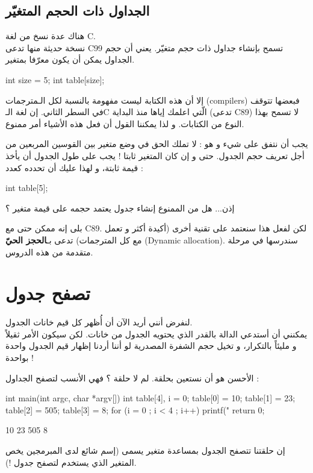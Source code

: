 \subsection{الجداول ذات الحجم المتغيّر}
هناك عدة نسخ من لغة
\textenglish{C}.\\
نسخة حديثة منها تدعى
\textenglish{C99}
تسمح بإنشاء جداول ذات حجم متغيّر. يعني أن حجم الجداول يمكن أن يكون معرّفا بمتغير.
\begin{Csource}
int size = 5;
int table[size];
\end{Csource}
إلا أن هذه الكتابة ليست مفهومة بالنسبة لكل الـمترجمات
(\textenglish{compilers})
فبعضها تتوقف في السطر الثاني. إن لغة
الـ\textenglish{C}
الّتي اعلمك إياها منذ البداية (تدعى
\textenglish{C89})
لا تسمح بهذا النوع من الكتابات. و لذا يمكننا القول أن فعل هذه الأشياء أمر ممنوع.

يجب أن نتفق على شيء و هو : لا تملك الحق في وضع متغير بين القوسين المربعين من أجل تعريف حجم الجدول. حتى و إن كان المتغير ثابتا ! يجب على طول الجدول أن يأخذ قيمة ثابتة، و لهذا عليك أن تحدده كعدد :
\begin{Csource}
int table[5];
\end{Csource}
\begin{question}
   إذن...  هل من الممنوع إنشاء جدول يعتمد حجمه على قيمة متغير ؟
\end{question}
بلى إنه ممكن حتى مع
\textenglish{C89}.
لكن لفعل هذا سنعتمد على تقنية أخرى (أكيدة أكثر و تعمل مع كل المترجمات) تدعى بـ\textbf{الحجز الحيّ}
(\textenglish{Dynamic allocation}).
سندرسها في مرحلة متقدمة من هذه الدروس.

\section{تصفح جدول}
لنفرض أنني أريد الآن أن أُظهر كل قيم خانات الجدول.\\
يمكنني أن أستدعي الدالة
بالقدر الذي يحتويه الجدول من خانات. لكن سيكون الأمر ثقيلاً و مليئاً بالتكرار، و تخيل حجم الشفرة المصدرية لو أننا أردنا إظهار قيم الجدول واحدة بواحدة !

الأحسن هو أن نستعين بحلقة. لم لا حلقة
؟ فهي الأنسب لتصفح الجداول :
\begin{Csource}
int main(int argc, char *argv[])
{
	int table[4], i = 0;
	table[0] = 10;
	table[1] = 23;
	table[2] = 505;
	table[3] = 8;
	for (i = 0 ; i < 4 ; i++)
	{
    		printf("%
	}
	return 0;
}
\end{Csource}
\begin{Console}
10
23
505
8
\end{Console}
إن حلقتنا تتصفح الجدول بمساعدة متغير يسمى
(إسم شائع لدى المبرمجين يخص المتغير الذي يستخدم لتصفح جدول !).

